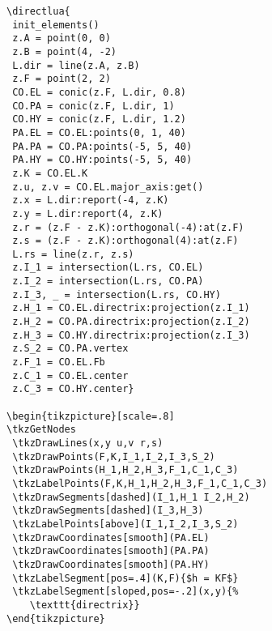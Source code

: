 \begin{verbatim}
\directlua{
 init_elements()
 z.A = point(0, 0)
 z.B = point(4, -2)
 L.dir = line(z.A, z.B)
 z.F = point(2, 2)
 CO.EL = conic(z.F, L.dir, 0.8)
 CO.PA = conic(z.F, L.dir, 1)
 CO.HY = conic(z.F, L.dir, 1.2)
 PA.EL = CO.EL:points(0, 1, 40)
 PA.PA = CO.PA:points(-5, 5, 40)
 PA.HY = CO.HY:points(-5, 5, 40)
 z.K = CO.EL.K
 z.u, z.v = CO.EL.major_axis:get()
 z.x = L.dir:report(-4, z.K)
 z.y = L.dir:report(4, z.K)
 z.r = (z.F - z.K):orthogonal(-4):at(z.F)
 z.s = (z.F - z.K):orthogonal(4):at(z.F)
 L.rs = line(z.r, z.s)
 z.I_1 = intersection(L.rs, CO.EL)
 z.I_2 = intersection(L.rs, CO.PA)
 z.I_3, _ = intersection(L.rs, CO.HY)
 z.H_1 = CO.EL.directrix:projection(z.I_1)
 z.H_2 = CO.PA.directrix:projection(z.I_2)
 z.H_3 = CO.HY.directrix:projection(z.I_3)
 z.S_2 = CO.PA.vertex
 z.F_1 = CO.EL.Fb
 z.C_1 = CO.EL.center
 z.C_3 = CO.HY.center}

\begin{tikzpicture}[scale=.8]
\tkzGetNodes
 \tkzDrawLines(x,y u,v r,s)
 \tkzDrawPoints(F,K,I_1,I_2,I_3,S_2)
 \tkzDrawPoints(H_1,H_2,H_3,F_1,C_1,C_3)
 \tkzLabelPoints(F,K,H_1,H_2,H_3,F_1,C_1,C_3)
 \tkzDrawSegments[dashed](I_1,H_1 I_2,H_2)
 \tkzDrawSegments[dashed](I_3,H_3)
 \tkzLabelPoints[above](I_1,I_2,I_3,S_2)
 \tkzDrawCoordinates[smooth](PA.EL)
 \tkzDrawCoordinates[smooth](PA.PA)
 \tkzDrawCoordinates[smooth](PA.HY)
 \tkzLabelSegment[pos=.4](K,F){$h = KF$}
 \tkzLabelSegment[sloped,pos=-.2](x,y){%
    \texttt{directrix}}
\end{tikzpicture}
\end{verbatim}



